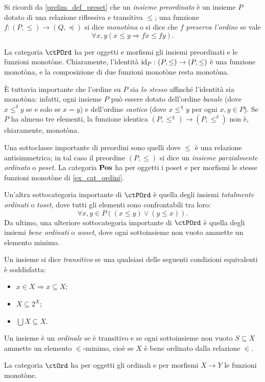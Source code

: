 \begin{example}\label{ex_cat_grafi}
	\Todo{}
\end{example}
\begin{example}\label{ex_cat_ordini}
	Si ricordi da \ref{prelim_def_preset} che un \emph{insieme preordinato} è un insieme \(P\) dotato di una relazione riflessiva e transitiva \(\le\); una funzione \(f  : (P,\le)\to (Q,\preceq)\) si dice \emph{monotòna} o si dice che \(f\) \emph{preserva l'ordine} se vale
	\[\forall x,y(x\le y\Rightarrow fx\le fy).\]

	La categoria \(\ctPOrd\) ha per oggetti e morfismi gli insiemi preordinati e le funzioni monotòne. Chiaramente, l'identità \(\mathrm{id}_P : (P,\le)\to (P,\le)\) è una funzione monotòna, e la composizione di due funzioni monotòne resta monotòna.

	\`E tuttavia importante che l'ordine su \(P\) sia \emph{lo stesso} affinché l'identità sia monotòna: infatti, ogni insieme \(P\) può essere dotato dell'ordine \emph{banale} (dove \(x \mathrel{\le^\delta} y\) se e solo se \(x=y\)) e dell'ordine \emph{caotico} (dove \(x\mathrel{\le^\chi} y\) per ogni \(x,y\in P\)). Se \(P\) ha almeno tre elementi, la funzione identica \((P,\le^\chi)\to (P,\le^\delta)\) non è, chiaramente, monotòna.
\end{example}
\begin{remark}[po, wo e to]\label{po_wo_to}
	Una sottoclasse importante di preordini sono quelli dove \(\le\) è una relazione antisimmetrica; in tal caso il preordine \((P,\le)\) si dice un \emph{insieme parzialmente ordinato} o \emph{poset}. La categoria \(\mathbf{Pos}\) ha per oggetti i poset e per morfismi le stesse funzioni monotòne di \ref{ex_cat_ordini}.

	Un'altra sottocategoria importante di \(\ctPOrd\) è quella degli insiemi \emph{totalmente ordinati} o \emph{toset}, dove tutti gli elementi sono confrontabili tra loro:
	\[\forall x,y\in P((x\le y)\lor (y\le x)).\]
	Da ultimo, una ulteriore sottocategoria importante di \(\ctPOrd\) è quella degli insiemi \emph{bene ordinati} o \emph{woset}, dove ogni sottoinsieme non vuoto ammette un elemento minimo.
\end{remark}
\begin{example}\label{ex_cat_ordinali}
	Un insieme si dice \emph{transitivo} se una qualsiasi delle seguenti condizioni equivalenti è soddisfatta:
	\begin{itemize}
		\item \(x\in X\Rightarrow x\subseteq X\);
		\item \(X\subseteq 2^X\);
		\item \(\bigcup X\subseteq X\).
	\end{itemize}
	Un insieme è un \emph{ordinale} se è transitivo e se ogni sottoinsieme non vuoto \(S\subseteq X\) ammette un elemento \(\in\)-minimo, cioè se \(X\) è bene ordinato dalla relazione \(\in\).

	La categoria \(\ctOrd\) ha per oggetti gli ordinali e per morfismi \(X\to Y\) le funzioni monotòne.
\end{example}
